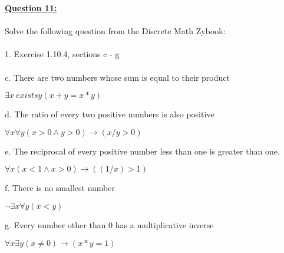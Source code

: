 \documentclass[11pt]{article}
\begin{document}
{\pagebreak
\noindent \textbf{\ul{Question 11:}} \\
\\
Solve the following question from the Discrete Math Zybook:\\\\
1. Exercise 1.10.4, sections c - g \\\\
c. There are two numbers whose sum is equal to their product\\
\begin{center}
$\exists x \ exists y (x + y = x*y) $
\end{center}
d. The ratio of every two positive numbers is also positive\\
\begin{center}
$\forall x \forall y (x > 0 \wedge y > 0) \rightarrow (x/y > 0)$
\end{center}
e. The reciprocal of every positive number less than one is greater than one.\\
\begin{center}
$\forall x (x < 1 \wedge x > 0) \rightarrow ((1 / x) > 1)$
\end{center}
f. There is no smallest number\\
\begin{center}
${\displaystyle \neg} \exists x \forall y(x < y) $
\end{center}
g. Every number other than 0 has a multiplicative inverse\\
\begin{center}
$\forall x \exists y(x \not = 0) \rightarrow (x*y = 1)$
\end{center}

}
\end{document}
